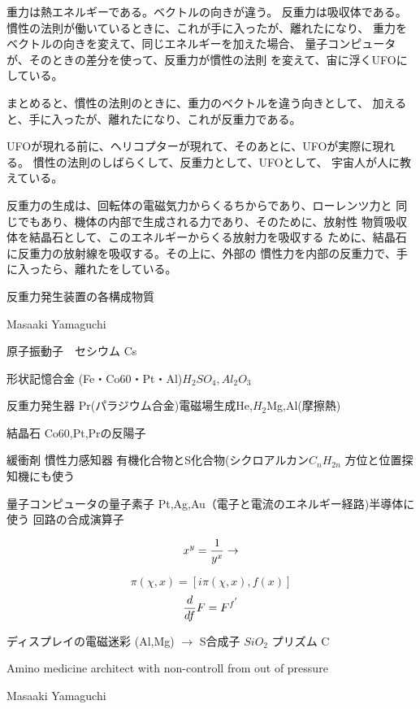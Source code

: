 \documentclass{jsarticle}
\begin{document}
{   重力は熱エネルギーである。ベクトルの向きが違う。
   反重力は吸収体である。
   慣性の法則が働いているときに、これが手に入ったが、離れたになり、
   重力をベクトルの向きを変えて、同じエネルギーを加えた場合、
   量子コンピュータが、そのときの差分を使って、反重力が慣性の法則
   を変えて、宙に浮くUFOにしている。 

   まとめると、慣性の法則のときに、重力のベクトルを違う向きとして、
   加えると、手に入ったが、離れたになり、これが反重力である。 

   UFOが現れる前に、ヘリコプターが現れて、そのあとに、UFOが実際に現れる。
   慣性の法則のしばらくして、反重力として、UFOとして、
   宇宙人が人に教えている。

   反重力の生成は、回転体の電磁気力からくるちからであり、ローレンツ力と
   同じでもあり、機体の内部で生成される力であり、そのために、放射性
   物質吸収体を結晶石として、このエネルギーからくる放射力を吸収する
   ために、結晶石に反重力の放射線を吸収する。その上に、外部の
   慣性力を内部の反重力で、手に入ったら、離れたをしている。


\newpage
\begin{center}
\large	反重力発生装置の各構成物質
	\end{center}
\begin{center}
	Masaaki Yamaguchi
\end{center}



  原子振動子　セシウム Cs


  形状記憶合金 (Fe・Co60・Pt・Al)$H_2 SO_4, Al_2 O_3$


  反重力発生器 Pr(パラジウム合金)電磁場生成He,$H_2$Mg,Al(摩擦熱)


  結晶石 Co60,Pt,Prの反陽子


  緩衝剤 慣性力感知器 有機化合物とS化合物(シクロアルカン$C_n H_{2n}$
  方位と位置探知機にも使う


  量子コンピュータの量子素子 Pt,Ag,Au（電子と電流のエネルギー経路)半導体に
  使う
  回路の合成演算子 


  $$ x^y = {1 \over {y^x}} \to $$

  $$ \pi(\chi,x) = [i\pi(\chi,x),f(x)] $$
  $$ {d \over df}F = F^{{f}^{'}} $$


  ディスプレイの電磁迷彩 (Al,Mg) $\to$ S合成子 $Si O_2 $
  プリズム C

\begin{center}
\large	Amino medicine architect with non-controll from out of pressure
\end{center}
\begin{center}
	Masaaki Yamaguchi
\end{center}


}
\end{document}
